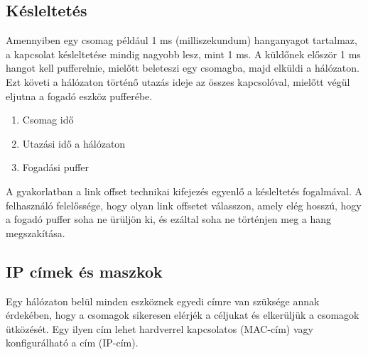 \subsection{Késleltetés}
Amennyiben egy csomag például 1 ms (milliszekundum) hanganyagot tartalmaz, a kapcsolat
késleltetése mindig nagyobb lesz, mint 1 ms.
A küldőnek először 1 ms hangot kell pufferelnie, mielőtt beleteszi egy csomagba, majd elküldi a hálózaton.
Ezt követi a hálózaton történő utazás ideje az összes kapcsolóval, mielőtt végül eljutna a fogadó eszköz pufferébe.
\begin{enumerate}
    \item Csomag idő
    \item Utazási idő a hálózaton
    \item Fogadási puffer
\end{enumerate}
A gyakorlatban a link offset technikai kifejezés egyenlő a késleltetés fogalmával.
A felhasználó felelőssége, hogy olyan link offsetet válasszon, amely elég hosszú, hogy a fogadó puffer soha ne ürüljön ki, és
ezáltal soha ne történjen meg a hang megszakítása. 
\subsection{IP címek és maszkok}
Egy hálózaton belül minden eszköznek egyedi címre van szüksége annak érdekében,
hogy a csomagok sikeresen elérjék a céljukat és elkerüljük a csomagok ütközését.
Egy ilyen cím lehet hardverrel kapcsolatos (MAC-cím) vagy konfigurálható a cím (IP-cím).
